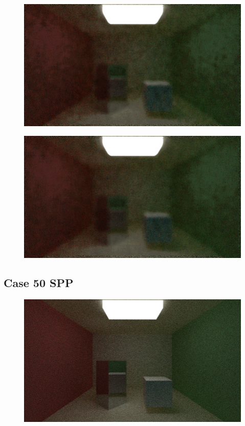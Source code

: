 \documentclass[titlepage,12pt]{report}
\begin{document}
\begin{appendices}
\begin{figure}[H]
	\centering
  	\includegraphics[scale=0.5]{media/median/cornell_normal_10_median_filter_17.png}
  	\label{ap11}
\end{figure}

\begin{figure}[H]
	\centering
  	\includegraphics[scale=0.5]{media/median/cornell_normal_10_median_filter_21.png}
  	\label{ap12}
\end{figure}

\subsection{Case 50 SPP}

\begin{figure}[H]
	\centering
  	\includegraphics[scale=0.5]{media/cornell_normal_50.png}
  	\label{ap13}
\end{figure}


\end{appendices}
\end{document}
